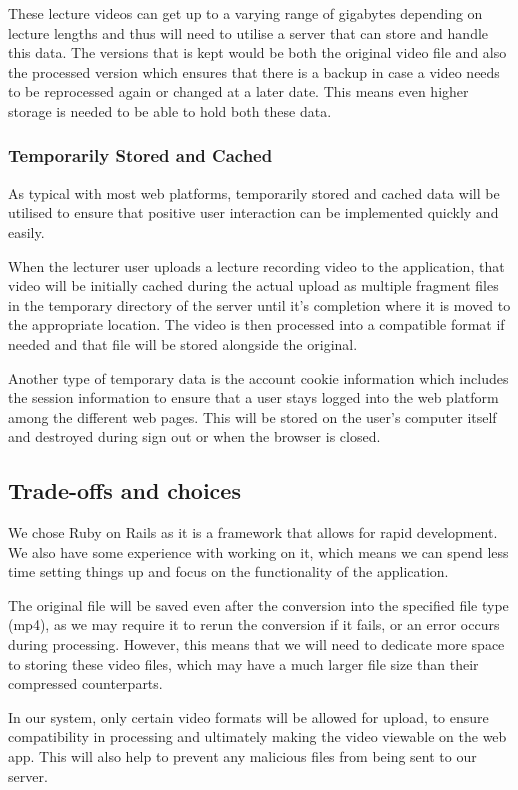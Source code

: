 \documentclass{article}
\begin{document}
These lecture videos can get up to a varying range of gigabytes depending on lecture lengths and thus will need to utilise a server that can store and handle this data. The versions that is kept would be both the original video file and also the processed version which ensures that there is a backup in case a video needs to be reprocessed again or changed at a later date. This means even higher storage is needed to be able to hold both these data.

\subsubsection{Temporarily Stored and Cached}
As typical with most web platforms, temporarily stored and cached data will be utilised to ensure that positive user interaction can be implemented quickly and easily. 

When the lecturer user uploads a lecture recording video to the application, that video will be initially cached during the actual upload as multiple fragment files in the temporary directory of the server until it's completion where it is moved to the appropriate location. The video is then processed into a compatible format if needed and that file will be stored alongside the original.

Another type of temporary data is the account cookie information which includes the session information to ensure that a user stays logged into the web platform among the different web pages. This will be stored on the user's computer itself and destroyed during sign out or when the browser is closed.

\subsection{Trade-offs and choices}
We chose Ruby on Rails as it is a framework that allows for rapid development. We also have some experience with working on it, which means we can spend less time setting things up and focus on the functionality of the application.

The original file will be saved even after the conversion into the specified file type (mp4), as we may require it to rerun the conversion if it fails, or an error occurs during processing. However, this means that we will need to dedicate more space to storing these video files, which may have a much larger file size than their compressed counterparts.

In our system, only certain video formats will be allowed for upload, to ensure compatibility in processing and ultimately making the video viewable on the web app. This will also help to prevent any malicious files from being sent to our server.
\end{document}
